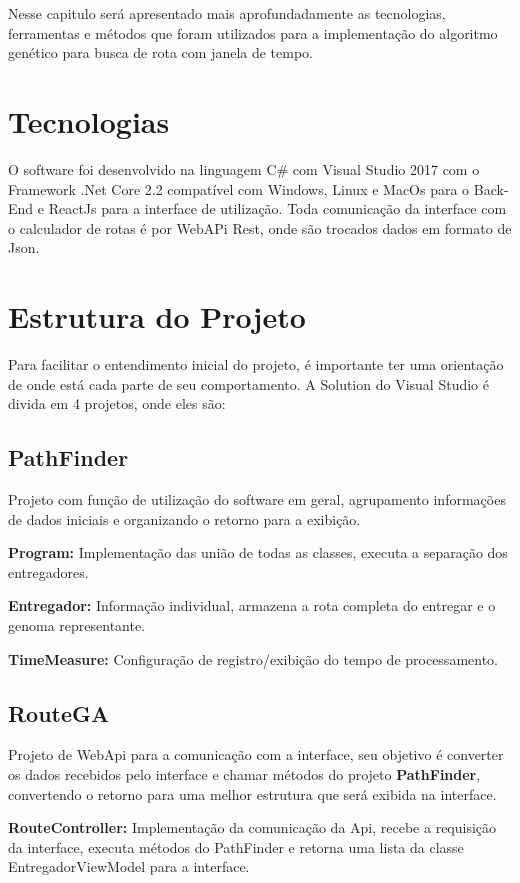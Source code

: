 Nesse capitulo será apresentado mais aprofundadamente as tecnologias, ferramentas e métodos que foram utilizados para a implementação do algoritmo genético para busca de rota com janela de tempo.

\section{Tecnologias}

O software foi desenvolvido na linguagem C\# com Visual Studio 2017 com o Framework  .Net Core 2.2 compatível com Windows, Linux e MacOs para o Back-End e ReactJs para a interface de utilização.
Toda comunicação da interface com o calculador de rotas é por WebAPi Rest, onde são trocados dados em formato de Json.

\section{Estrutura do Projeto}

Para facilitar o entendimento inicial do projeto, é importante ter uma orientação de onde está cada parte de seu comportamento. A Solution do Visual Studio é divida em 4 projetos, onde eles são:

\subsection{PathFinder}
Projeto com função de utilização do software em geral, agrupamento informações de dados iniciais e organizando o retorno para a exibição.

\textbf{Program:} Implementação das união de todas as classes, executa a separação dos entregadores.

\textbf{Entregador:} Informação individual, armazena a rota completa do entregar e o genoma representante.

\textbf{TimeMeasure:} Configuração de registro/exibição do tempo de processamento.

\subsection{RouteGA}
Projeto de WebApi para a comunicação com a interface, seu objetivo é converter os dados recebidos pelo interface e chamar métodos do projeto \textbf{PathFinder}, convertendo o retorno para uma melhor estrutura que será exibida na interface.

\textbf{RouteController:} Implementação da comunicação da Api, recebe a requisição da interface, executa métodos do PathFinder e retorna uma lista da classe EntregadorViewModel para a interface.

